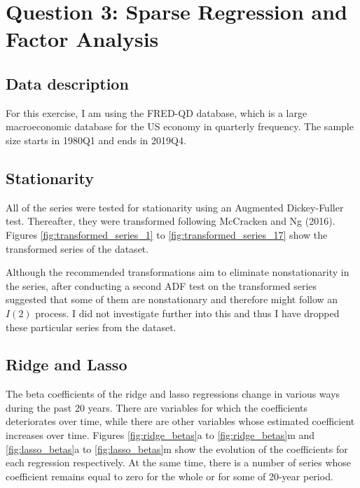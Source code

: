 \documentclass{article}
\begin{document}


\section{Question 3: Sparse Regression and Factor Analysis}
\subsection{Data description}
For this exercise, I am using the FRED-QD database, which is a large macroeconomic database for the US economy in quarterly frequency. The sample size starts in 1980Q1 and ends in 2019Q4.


\subsection{Stationarity}
All of the series were tested for stationarity using an Augmented Dickey-Fuller test. Thereafter, they were transformed following McCracken and Ng (2016). Figures \ref{fig:transformed_series_1} to \ref{fig:transformed_series_17} show the transformed series of the dataset.
\par
Although the recommended transformations aim to eliminate nonstationarity in the series, after conducting a second ADF test on the transformed series suggested that some of them are nonstationary and therefore might follow an $I(2)$ process. I did not investigate further into this and thus I have dropped these particular series from the dataset.

\subsection{Ridge and Lasso}
The beta coefficients of the ridge and lasso regressions change in various ways during the past 20 years. There are variables for which the coefficients deteriorates over time, while there are other variables whose estimated coefficient increases over time. Figures \ref{fig:ridge_betas}a to \ref{fig:ridge_betas}m and \ref{fig:lasso_betas}a to \ref{fig:lasso_betas}m show the evolution of the coefficients for each regression respectively. At the same time, there is a number of series whose coefficient remains equal to zero for the whole or for some of 20-year period.
\end{document}
